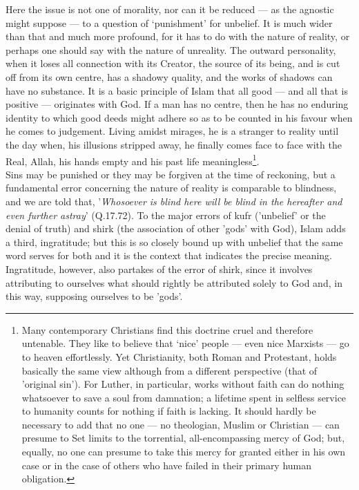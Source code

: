 \documentclass[10pt, twoside,openright]{book}
\begin{document}
Here the issue is not one of morality, nor can it be reduced --- as the agnostic might suppose --- to a 
question of `punishment' for unbelief. It is much wider than that and much more profound, for it has 
to do with the nature of reality, or perhaps one should say with the nature of unreality. The outward 
personality, when it loses all connection with its Creator, the source of its being, and is cut off 
from its own centre, has a shadowy quality, and the works of shadows can have no substance. It is a 
basic principle of Islam that all good --- and all that is positive --- originates with God. If a man has 
no centre, then he has no enduring identity to which good deeds might adhere so as to be counted in 
his favour when he comes to judgement. Living amidst mirages, he is a stranger to reality until the 
day when, his illusions stripped away, he finally comes face to face with the Real, Allah, his hands 
empty and his past life meaningless\footnote{Many contemporary Christians find this doctrine cruel and therefore untenable. They like to believe 
that `nice' people --- even nice Marxists --- go to heaven effortlessly. Yet Christianity, both Roman and 
Protestant, holds basically the same view although from a different perspective (that of 'original 
sin'). For Luther, in particular, works without faith can do nothing whatsoever to save a soul from 
damnation; a lifetime spent in selfless service to humanity counts for nothing if faith is lacking. 
It should hardly be necessary to add that no one --- no theologian, Muslim or Christian --- can presume 
to Set limits to the torrential, all\hyp{}encompassing mercy of God; but, equally, no one can presume to 
take this mercy for granted either in his own case or in the case of others who have failed in their 
primary human obligation.}.\\

Sins may be punished or they may be forgiven at the time of reckoning, but a fundamental error 
concerning the nature of reality is comparable to blindness, and we are told that, '\emph{Whosoever is 
blind here will be blind in the hereafter and even further astray}' (Q.17.72). To the major errors of 
kufr ('unbelief' or the denial of truth) and shirk (the association of other 'gods' with God), Islam 
adds a third, ingratitude; but this is so closely bound up with unbelief that the same word serves 
for both and it is the context that indicates the precise meaning. Ingratitude, however, also 
partakes of the error of shirk, since it involves attributing to ourselves what should rightly be 
attributed solely to God and, in this way, supposing ourselves to be 'gods'. \\
\end{document}

